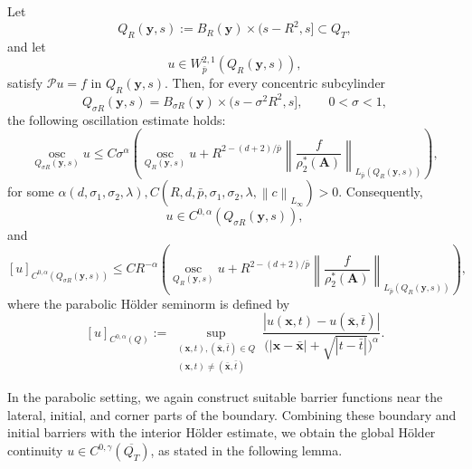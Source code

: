 \documentclass[final,onefignum,onetabnum]{mousaviart}
\begin{document}
	\begin{lemma}
		\label{lem:parabolic-interior-Holder-continuity}
		Let
		\[
		Q_R(\boldsymbol{y}, s)
		:=
		B_R(\boldsymbol{y})\times (s-R^2,s]
		\subset Q_T,
		\]
		and let
		\[
		u \in W^{2,1}_{\bar{p}}(Q_R(\boldsymbol{y}, s)),
		\]
		satisfy $\mathcal{P}u = f$ in $Q_R(\boldsymbol{y}, s)$.
		Then, for every concentric subcylinder
		\[
		Q_{\sigma R}(\boldsymbol{y}, s)
		=
		B_{\sigma R}(\boldsymbol{y})
		\times
		(s-\sigma^2R^2,s],
		\qquad 0<\sigma<1,
		\]
		the following oscillation estimate holds:
		\begin{equation}
			\label{ineq:parabolic-oscillation-bound}
			\operatorname*{osc}_{Q_{\sigma R}(\boldsymbol{y}, s)} u
			\le
			C \sigma^\alpha
			\left(
			\operatorname*{osc}_{Q_R(\boldsymbol{y}, s)} u
			+
			R^{2-(d+2)/{\bar{p}}}
			\left\|
			\frac{f}{\rho_2^\ast(\boldsymbol{A})}
			\right\|_{L_{\bar{p}}(Q_R(\boldsymbol{y}, s))}
			\right),
		\end{equation}
		for some
		$\alpha(d,\sigma_1, \sigma_2,\lambda),C(R, d, \bar{p},\sigma_1,\sigma_2, \lambda, \left\| c \right\|_{L_{\infty}} )>0$.
		Consequently,
		\[
		u\in C^{0,\alpha} (Q_{\sigma R}(\boldsymbol{y}, s)),
		\]
		and
		\begin{equation}
			\label{ineq:parabolic-interior-Holder}
			[u]_{C^{0,\alpha}(Q_{\sigma R}(\boldsymbol{y}, s))}
			\le
			C R^{-\alpha}
			\left(
			\operatorname*{osc}_{Q_R(\boldsymbol{y}, s)} u
			+
			R^{2-(d+2)/{\bar{p}}}
			\left\|
			\frac{f}{\rho_2^\ast(\boldsymbol{A})}
			\right\|_{L_{\bar{p}}(Q_R(\boldsymbol{y}, s))}
			\right),
		\end{equation}
		where the parabolic Hölder seminorm is defined by
		\[
		[u]_{C^{0,\alpha}(Q)}
		:=
		\sup_{\substack{(\boldsymbol{x},t),(\bar{ \boldsymbol{x}},\bar{t})\in Q\\(\boldsymbol{x},t)\neq(\bar{ \boldsymbol{x}},\bar{t})}}
		\frac{|u(\boldsymbol{x},t)-u(\bar{\boldsymbol{x}},\bar{t})|}
		{
			\bigl(|\boldsymbol{x} - \bar{\boldsymbol{x}}|
			+
			\sqrt{|t-\bar{t}|}\bigr)^\alpha
		}.
		\]
	\end{lemma}
	In the parabolic setting, we again construct suitable barrier functions near the lateral, initial, and corner parts of the boundary. Combining these boundary and initial barriers with the interior Hölder estimate, we obtain the global Hölder continuity \(u \in C^{0,\gamma}(\overline{Q_T})\), as stated in the following lemma.
\end{document}
